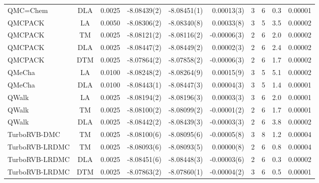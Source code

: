 \begin{tabular}{|lc|lr|r|r|cccc|}
QMC=Chem         &  DLA  & 0.0025 & -8.08439(2) & -8.08451(1) & 0.00013(3) & 3 & 6 & 0.3 & 0.00001 \\
QMCPACK          &  LA   & 0.0050 & -8.08306(2) & -8.08340(8) & 0.00033(8) & 3 & 5 & 3.5 & 0.00002 \\
QMCPACK          &  TM   & 0.0025 & -8.08121(2) & -8.08116(2) & -0.00006(3) & 2 & 6 & 2.0 & 0.00002 \\
QMCPACK          &  DLA  & 0.0025 & -8.08447(2) & -8.08449(2) & 0.00002(3) & 2 & 6 & 2.4 & 0.00002 \\
QMCPACK          &  DTM  & 0.0025 & -8.07864(2) & -8.07858(2) & -0.00006(3) & 2 & 6 & 1.7 & 0.00002 \\
QMeCha           &  LA   & 0.0100 & -8.08248(2) & -8.08264(9) & 0.00015(9) & 3 & 5 & 5.1 & 0.00002 \\
QMeCha           &  DLA  & 0.0100 & -8.08443(1) & -8.08447(3) & 0.00004(3) & 3 & 5 & 1.4 & 0.00001 \\
QWalk            &  LA   & 0.0025 & -8.08194(2) & -8.08196(3) & 0.00003(3) & 3 & 6 & 2.0 & 0.00001 \\
QWalk            &  TM   & 0.0025 & -8.08100(2) & -8.08099(2) & -0.00001(2) & 2 & 6 & 1.7 & 0.00001 \\
QWalk            &  DLA  & 0.0025 & -8.08442(2) & -8.08439(3) & -0.00003(3) & 2 & 6 & 3.8 & 0.00002 \\
TurboRVB-DMC     &  TM   & 0.0025 & -8.08100(6) & -8.08095(6) & -0.00005(8) & 3 & 8 & 1.2 & 0.00004 \\
TurboRVB-LRDMC   &  TM   & 0.0025 & -8.08093(6) & -8.08093(5) & 0.00000(8) & 2 & 6 & 0.8 & 0.00004 \\
TurboRVB-LRDMC   &  DLA  & 0.0025 & -8.08451(6) & -8.08448(3) & -0.00003(6) & 2 & 6 & 0.3 & 0.00002 \\
TurboRVB-LRDMC   &  DTM  & 0.0025 & -8.07863(2) & -8.07860(1) & -0.00004(2) & 3 & 6 & 0.5 & 0.00001 \\
\bottomrule
\end{tabular}
